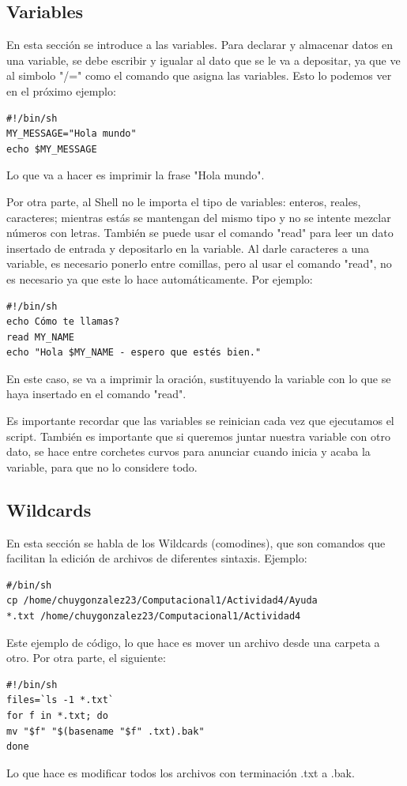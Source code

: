 \documentclass[a4paper]{article}
\begin{document}
\subsection{Variables}
En esta sección se introduce a las variables. Para declarar y almacenar datos en una variable, se debe escribir y igualar al dato que se le va a depositar, ya que ve al simbolo "/=" como el comando que asigna las variables. Esto lo podemos ver en el próximo ejemplo:
\begin{verbatim}
#!/bin/sh
MY_MESSAGE="Hola mundo"
echo $MY_MESSAGE
\end{verbatim}
Lo que va a hacer es imprimir la frase "Hola mundo".

Por otra parte, al Shell no le importa el tipo de variables: enteros, reales, caracteres; mientras estás se mantengan del mismo tipo y no se intente mezclar números con letras. También se puede usar el comando "read" para leer un dato insertado de entrada y depositarlo en la variable. Al darle caracteres a una variable, es necesario ponerlo entre comillas, pero al usar el comando "read", no es necesario ya que este lo hace automáticamente. Por ejemplo:
\begin{verbatim}
#!/bin/sh
echo Cómo te llamas?
read MY_NAME
echo "Hola $MY_NAME - espero que estés bien."
\end{verbatim}
En este caso, se va a imprimir la oración, sustituyendo la variable con lo que se haya insertado en el comando "read".

Es importante recordar que las variables se reinician cada vez que ejecutamos el script. También es importante que si queremos juntar nuestra variable con otro dato, se hace entre corchetes curvos para anunciar cuando inicia y acaba la variable, para que no lo considere todo. 

\subsection{Wildcards}

En esta sección se habla de los Wildcards (comodines), que son comandos que facilitan la edición de archivos de diferentes sintaxis. 
Ejemplo:
\begin{verbatim}
#/bin/sh
cp /home/chuygonzalez23/Computacional1/Actividad4/Ayuda 
*.txt /home/chuygonzalez23/Computacional1/Actividad4
\end{verbatim}
Este ejemplo de código, lo que hace es mover un archivo desde una carpeta a otro. 
Por otra parte, el siguiente:
\begin{verbatim}
#!/bin/sh
files=`ls -1 *.txt`
for f in *.txt; do
mv "$f" "$(basename "$f" .txt).bak"
done
\end{verbatim}
Lo que hace es modificar todos los archivos con terminación .txt a .bak.
\end{document}
